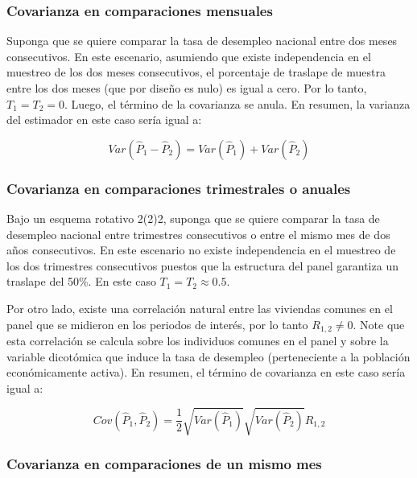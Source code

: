 \documentclass[
  12pt,
]{book}
\begin{document}
\hypertarget{covarianza-en-comparaciones-mensuales}{%
\subsubsection{Covarianza en comparaciones mensuales}\label{covarianza-en-comparaciones-mensuales}}

Suponga que se quiere comparar la tasa de desempleo nacional entre dos meses consecutivos. En este escenario, asumiendo que existe independencia en el muestreo de los dos meses consecutivos, el porcentaje de traslape de muestra entre los dos meses (que por diseño es nulo) es igual a cero. Por lo tanto, \(T_1 = T_2 = 0\). Luego, el término de la covarianza se anula. En resumen, la varianza del estimador en este caso sería igual a:

\[
Var(\hat{P}_1-\hat{P}_2) 
= Var(\hat{P}_1) + Var(\hat{P}_2)
\]

\hypertarget{covarianza-en-comparaciones-trimestrales-o-anuales}{%
\subsubsection{Covarianza en comparaciones trimestrales o anuales}\label{covarianza-en-comparaciones-trimestrales-o-anuales}}

Bajo un esquema rotativo 2(2)2, suponga que se quiere comparar la tasa de desempleo nacional entre trimestres consecutivos o entre el mismo mes de dos años consecutivos. En este escenario no existe independencia en el muestreo de los dos trimestres consecutivos puestos que la estructura del panel garantiza un traslape del 50\%. En este caso \(T_1 = T_2 \approx 0.5\).

Por otro lado, existe una correlación natural entre las viviendas comunes en el panel que se midieron en los periodos de interés, por lo tanto \(R_{1,2} \neq 0\). Note que esta correlación se calcula sobre los individuos comunes en el panel y sobre la variable dicotómica que induce la tasa de desempleo (perteneciente a la población económicamente activa). En resumen, el término de covarianza en este caso sería igual a:

\[
Cov(\hat{P}_1, \hat{P}_2) = \frac{1}{2}\sqrt{Var(\hat{P}_1)}\sqrt{Var(\hat{P}_2)}R_{1,2}
\]

\hypertarget{covarianza-en-comparaciones-de-un-mismo-mes}{%
\subsubsection{Covarianza en comparaciones de un mismo mes}\label{covarianza-en-comparaciones-de-un-mismo-mes}}
\end{document}
